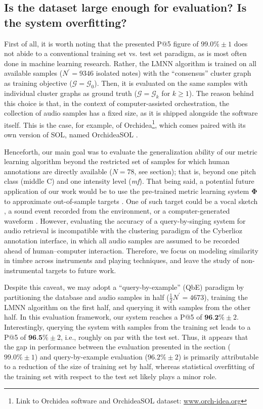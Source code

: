 \documentclass{bmcart}
\newcommand{\lnameref}[1]{%
\bgroup
\let\nmu\MakeLowercase
\nameref{#1}\egroup}
\newcommand{\nmu}{}
\begin{document}
\subsection*{Is the dataset large enough for evaluation? Is the system overfitting?}
First of all, it is worth noting that the presented P@5 figure of $99.0\% \pm 1$ does not abide to a conventional training set vs. test set paradigm, as is most often done in machine learning research.
Rather, the LMNN algorithm is trained on all available samples ($N^{\prime}=9346$ isolated notes) with the ``consensus'' cluster graph as training objective ($\mathcal{G}=\mathcal{G}_0$).
Then, it is evaluated on the same samples with individual cluster graphs as ground truth ($\mathcal{G}=\mathcal{G}_k$ for $k\geq1$).
The reason behind this choice is that, in the context of computer-assisted orchestration, the collection of audio samples has a fixed size, as it is shipped alongside the software itself.
This is the case, for example, of Orchidea\footnote{Link to Orchidea software and OrchideaSOL dataset: \url{www.orch-idea.org}}, which comes paired with its own version of SOL, named OrchideaSOL \cite{cella2020icmc}.

Henceforth, our main goal was to evaluate the generalization ability of our metric learning algorithm beyond the restricted set of samples for which human annotations are directly available ($N=78$, see \lnameref{sec:survey} section); that is, beyond one pitch class (middle C) and one intensity level (\emph{mf}).
That being said, a potential future application of our work would be to use the pre-trained metric learning system $\mathbf{\Phi}$ to approximate out-of-sample targets \cite{carpentier2012cmj}.
One of such target could be a vocal sketch \cite{cartwright2015acm}, a sound event recorded from the environment, or a computer-generated waveform \cite{lemaitre2016plosone}.
However, evaluating the accuracy of a query-by-singing system for audio retrieval is incompatible with the clustering paradigm of the Cyberlioz annotation interface, in which all audio samples are assumed to be recorded ahead of human--computer interaction.
Therefore, we focus on modeling similarity in timbre across instruments and playing techniques, and leave the study of non-instrumental targets to future work.

Despite this caveat, we may adopt a ``query-by-example'' (QbE) paradigm by  partitioning the database and audio samples in half ($\frac{1}{2}N^{\prime}=4673$), training the LMNN algorithm on the first half, and querying it with samples from the other half.
In this evaluation framework, our system reaches a P@5 of $\textbf{96.2\%} \pm 2$.
Interestingly, querying the system with samples from the training set leads to a P@5 of $\textbf{96.5\%} \pm 2$, i.e., roughly on par with the test set.
Thus, it appears that the gap in performance between the evaluation presented in the \lnameref{sec:results} section ($99.0\%\pm 1$) and query-by-example evaluation ($96.2\% \pm 2$) is primarily attributable to a reduction of the size of training set by half, whereas statistical overfitting of the training set with respect to the test set likely plays a minor role.
\end{document}
